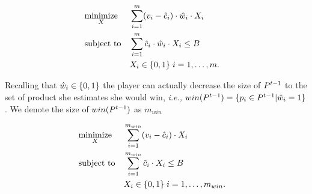 
\begin{equation*}
\begin{aligned}
& \underset{X}{\text{minimize}} & & \sum_{i=1}^{m} (v_{i} - \hat{c}_{i})\cdot\hat{w}_{i}\cdot X_{i} \\
& \text{subject to} & & \sum_{i=1}^{m} \hat{c}_{i}\cdot\hat{w}_{i}\cdot X_{i} \leq B \\
& & & X_{i} \in \{0,1\} \; i = 1, \ldots, m. & 
\end{aligned}
\end{equation*}

\noindent Recalling that $\hat{w}_{i}\in \{0,1\}$ the player can actually decrease the size of $P^{t-1}$ to the set of product she estimates she would win, \emph{i.e.,} $win(P^{t-1}) = \{p_{i}\in P^{t-1} | \hat{w}_{i} = 1\}$. We denote the size of $win(P^{t-1})$ as $m_{win}$  

\begin{equation*}
\begin{aligned}
& \underset{X}{\text{minimize}} & & \sum_{i=1}^{m_{win}} (v_{i} - \hat{c}_{i})\cdot X_{i} \\
& \text{subject to} & & \sum_{i=1}^{m_{win}} \hat{c}_{i}\cdot X_{i} \leq B \\
& & & X_{i} \in \{0,1\} \; i = 1, \ldots, m_{win}. & 
\end{aligned}
\end{equation*}
